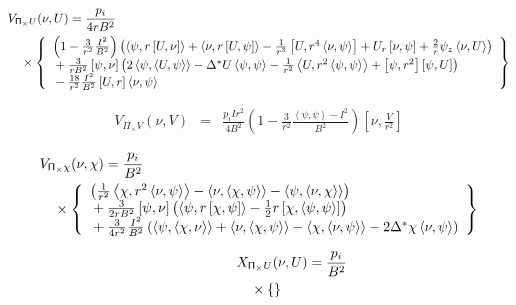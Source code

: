 \documentclass[letterpaper]{book}
\newcommand{\tensor}[1]{\mathsf{#1}}
\renewcommand{\P}{\tensor{\Pi}}
\newcommand{\gs}[1]{\Delta^* #1}
\newcommand{\pb}[2]{\left[#1,#2\right]}
\newcommand{\ip}[2]{\left\langle  #1,#2\right\rangle}
\begin{document}
\begin{eqnarray*}
  & \lefteqn{V_{\P_\times U}(\nu, U) = \frac{p_i}{4 r B^2}} &
  \\ && \mbox{} \times 
  \left\{ \begin{array}{l}
    \left(1 - \frac{3}{r^2} \frac{I^2}{B^2} \right)
    \left( \ip{\psi}{r \pb{U}{\nu}}+\ip{\nu}{r \pb{U}{\psi}}
          -\frac{1}{r^3} \pb{U}{r^4 \ip{\nu}{\psi}}
	  +U_r \pb{\nu}{\psi} + \frac{2}{r} \psi_z \ip{\nu}{U} \right)
    \\ \mbox{} + 
    \frac{3}{r B^2} \pb{\psi}{\nu}
    \left( 2\ip{\psi}{\ip{U}{\psi}} - \gs{U}\ip{\psi}{\psi} 
          - \frac{1}{r^2}\ip{U}{r^2\ip{\psi}{\psi}} 
	  +\pb{\psi}{r^2}\pb{\psi}{U} \right)
    \\ \mbox{} - 
    \frac{18}{r^2} \frac{I^2}{B^2} \pb{U}{r} \ip{\nu}{\psi}
  \end{array} \right\}
\end{eqnarray*}

\begin{eqnarray*}
  V_{\P_\times V}(\nu, V) & = & \frac{p_i I r^2}{4 B^2}
  \left(1 - \frac{3}{r^2} \frac{\ip{\psi}{\psi} - I^2}{B^2} \right)
    \pb{\nu}{\frac{V}{r^2}}
\end{eqnarray*}

\begin{eqnarray*}
  & \lefteqn{V_{\P_\times \chi}(\nu, \chi) = \frac{p_i}{B^2}} &
  \\ && \mbox{} \times 
  \left\{ \begin{array}{l}
    \left( \frac{1}{r^2}\ip{\chi}{r^2 \ip{\nu}{\psi}}
          -\ip{\nu}{\ip{\chi}{\psi}} - \ip{\psi}{\ip{\nu}{\chi}} \right)
    \\ \mbox{} + \frac{3}{2 r B^2} \pb{\psi}{\nu}
    \left( \ip{\psi}{r \pb{\chi}{\psi}} 
         - \frac{1}{2} r \pb{\chi}{\ip{\psi}{\psi}} \right)
    \\ \mbox{} + \frac{3}{4 r^2} \frac{I^2}{B^2}
    \left( \ip{\psi}{\ip{\chi}{\nu}} + \ip{\nu}{\ip{\chi}{\psi}}
          -\ip{\chi}{\ip{\nu}{\psi}} - 2 \gs{\chi}\ip{\nu}{\psi} \right)
  \end{array} \right\}
\end{eqnarray*}

\begin{eqnarray*}
  & \lefteqn{X_{\P_\times U}(\nu, U) = \frac{p_i}{B^2}} &
  \\ && \mbox{} \times  
  \left\{ \right\}
\end{eqnarray*}
\end{document}
